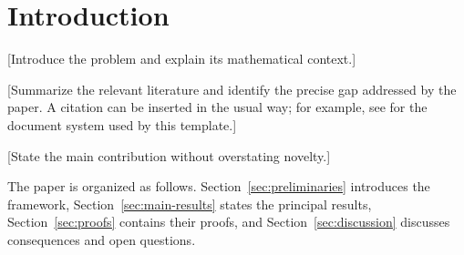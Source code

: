 \section{Introduction}
\label{sec:introduction}

[Introduce the problem and explain its mathematical context.]

[Summarize the relevant literature and identify the precise gap addressed by
the paper. A citation can be inserted in the usual way; for example, see
\cite{lamport1994latex} for the document system used by this template.]

[State the main contribution without overstating novelty.]

The paper is organized as follows. Section~\ref{sec:preliminaries} introduces
the framework, Section~\ref{sec:main-results} states the principal results,
Section~\ref{sec:proofs} contains their proofs, and
Section~\ref{sec:discussion} discusses consequences and open questions.
